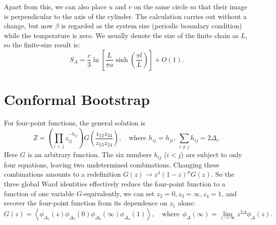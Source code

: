 \documentclass[aps,prb,superscriptaddress,nofootinbib]{revtex4}
\begin{document}
Apart from this, we can also place $u$ and $v$ on the same circle so that their image is perpendicular to the axis of the cylinder.
The calculation carries out without a change, but now $\beta$ is regarded as the system size (periodic boundary condition) while the temperature is zero.
We usually denote the size of the finite chain as $L$, so the finite-size result is:
\begin{equation}
	S_A = \frac{c}{3} \ln \left[\frac{L}{\pi a}\sinh\left(\frac{\pi l}{L}\right)\right] + O(1).
\end{equation}




\section{Conformal Bootstrap}

For four-point functions, the general solution is
\begin{equation}
	Z = \left(\prod_{i<j} z_{ij}^{-h_{i j}}\right) G\left(\frac{z_{12}z_{34}}{z_{13}z_{24}}\right),\quad
	\text{where } h_{ij} = h_{ji},\ \sum_{i\ne j} h_{ij} = 2\Delta_i. 
\end{equation}
Here $G$ is an arbitrary function. 
The six numbers $h_{ij}$ ($i<j$) are subject to only four equations, leaving two undetermined combinations. 
Changing these combinations amounts to a redefinition $G(z) \rightarrow z^\lambda(1-z)^\mu G(z)$.
So the three global Ward identities effectively reduce the four-point function to a function of one variable $G$-equivalently, we can set $z_2=0, z_3=\infty, z_4=1$, and recover the four-point function from its dependence on $z_1$ alone:
\begin{equation}
	G(z)=\left\langle \phi_{\Delta_1}(z) \phi_{\Delta_2}(0) \phi_{\Delta_3}(\infty) \phi_{\Delta_4}(1)\right\rangle,\quad\text{where}\ \ 
	\phi_{\Delta}(\infty)=\lim _{z \rightarrow \infty} z^{2 \Delta} \phi_{\Delta}(z).
\end{equation}
\end{document}
